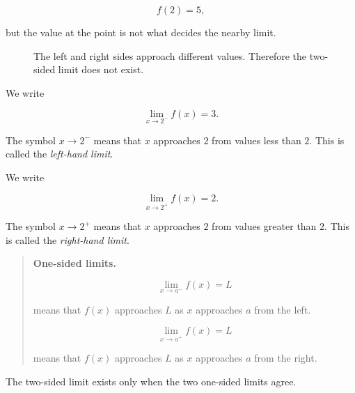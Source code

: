 \[
f(2)=5,
\]

but the value at the point is not what decides the nearby limit.

\begin{figure}[h]
\centering
{}
\caption{The left and right sides approach different values.  Therefore the two-sided limit does not exist.}
\label{fig:one-sided-different-limits}
\end{figure}

We write

\[
\lim_{x\to2^-}f(x)=3.
\]

The symbol \(x\to2^-\) means that \(x\) approaches \(2\) from values less than \(2\).  This is called the \emph{left-hand limit}.

We write

\[
\lim_{x\to2^+}f(x)=2.
\]

The symbol \(x\to2^+\) means that \(x\) approaches \(2\) from values greater than \(2\).  This is called the \emph{right-hand limit}.

\begin{quote}
\textbf{One-sided limits.}

\[
\lim_{x\to a^-}f(x)=L
\]

means that \(f(x)\) approaches \(L\) as \(x\) approaches \(a\) from the left.

\[
\lim_{x\to a^+}f(x)=L
\]

means that \(f(x)\) approaches \(L\) as \(x\) approaches \(a\) from the right.
\end{quote}

The two-sided limit exists only when the two one-sided limits agree.

